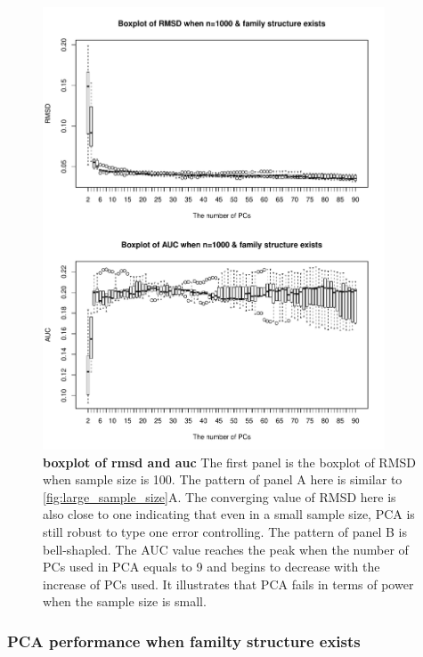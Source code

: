 \documentclass[12pt]{article}
\begin{document}
\begin{figure}[bp!]
  \centering
  \includegraphics[width=4in]{PCA_n_1000_m_100_family_structure.pdf}
  \caption{
    {\bf boxplot of rmsd and auc}
    The first panel is the boxplot of RMSD when sample size is 100.
    The pattern of panel A here is similar to \cref{fig:large_sample_size}A.
    The converging value of RMSD here is also close to one indicating that even in a small sample size, PCA is still robust to type one error controlling.
    The pattern of panel B is bell-shapled.
    The AUC value reaches the peak when the number of PCs used in PCA equals to 9 and begins to decrease with the increase of PCs used.
    It illustrates that PCA fails in terms of power when the sample size is small.
  }
  \label{fig:family_structure}
\end{figure}

\subsubsection{PCA performance when familty structure exists}
\end{document}
